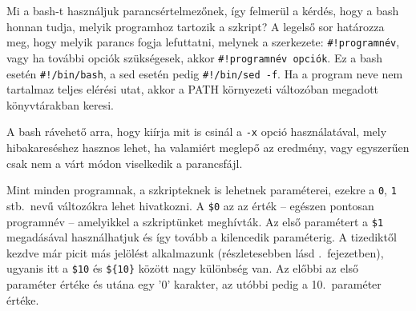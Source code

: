 Mi a bash-t használjuk parancsértelmezőnek, így felmerül a kérdés, hogy a bash
honnan tudja, melyik programhoz tartozik a szkript?  A legelső sor határozza
meg, hogy melyik parancs fogja lefuttatni, melynek a szerkezete:
\texttt{\#!programnév}, vagy ha további opciók szükségesek, akkor
\texttt{\#!programnév opciók}. Ez a bash esetén \texttt{\#!/bin/bash}, a sed
esetén pedig \texttt{\#!/bin/sed -f}. Ha a program neve nem tartalmaz teljes
elérési utat, akkor a PATH környezeti változóban megadott könyvtárakban keresi.

A bash rávehető arra, hogy kiírja mit is csinál a \texttt{-x} opció
használatával, mely hibakareséshez hasznos lehet, ha valamiért meglepő az
eredmény, vagy egyszerűen csak nem a várt módon viselkedik a parancsfájl.

Mint minden programnak, a szkripteknek is lehetnek paraméterei, ezekre a
\texttt{0}, \texttt{1} stb.\ nevű változókra lehet hivatkozni. A \texttt{\$0} az
az érték -- egészen pontosan programnév -- amelyikkel a szkriptünket
meghívták. Az első paramétert a
\texttt{\$1} megadásával használhatjuk és így tovább a kilencedik paraméterig. A
tizediktől kezdve már picit más jelölést alkalmazunk (részletesebben lásd
.\ fejezetben), ugyanis itt a \texttt{\$10} és
\texttt{\$\{10\}} között nagy különbség van. Az előbbi az első paraméter értéke
és utána egy '0' karakter, az utóbbi pedig a 10.\ paraméter értéke.


